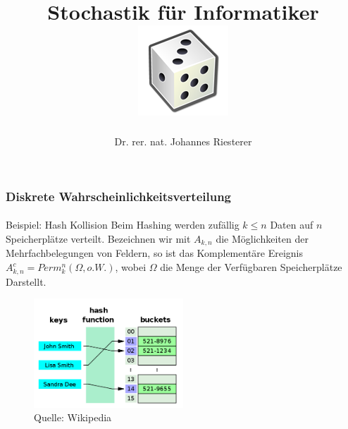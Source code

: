 \documentclass{beamer}
\begin{document}
\title[Stochastik] %
{Stochastik für Informatiker
\\
\includegraphics[scale=0.5]{img/craps}
}
\subtitle{}
\author[Dr. Johannes Riesterer] %
{Dr.  rer. nat. Johannes Riesterer}

\date[KPT 2004] %
{}

\subject{Stochastik}


\frame{\titlepage}




\begin{frame}
    \frametitle{Diskrete Wahrscheinlichkeitsverteilung}
\framesubtitle{}

\begin{block}{Beispiel: Hash Kollision}
Beim Hashing werden zufällig $k \leq n$ Daten auf $n$ Speicherplätze  verteilt. Bezeichnen wir mit $A_{k,n}$ die Möglichkeiten der Mehrfachbelegungen von Feldern, so ist das Komplementäre Ereignis
$A^c_{k,n} = Perm^n_k(\Omega, o.W.)$,  wobei $\Omega$ die Menge der Verfügbaren Speicherplätze Darstellt. 
\end{block}


\begin{figure}[htp]
      \centering
    \includegraphics[width=0.5\textwidth]{img/hashtable}

      \caption{Quelle: Wikipedia}
\end{figure}


 \end{frame}
\end{document}
